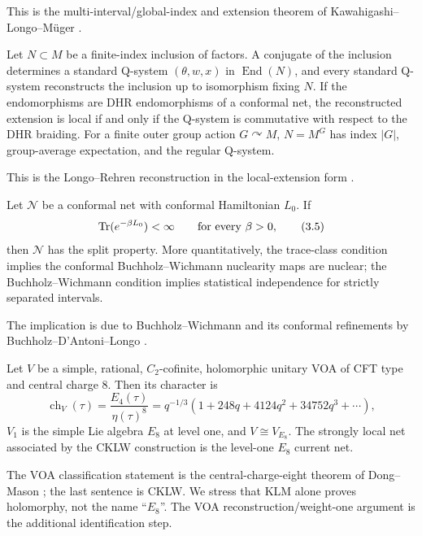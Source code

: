 This is the multi-interval/global-index and extension theorem of
Kawahigashi--Longo--M\"uger \cite{KLM}.

\begin{theorem}
\label{thm:Qsystems}
Let $N\subset M$ be a finite-index inclusion of factors.  A conjugate of
the inclusion determines a standard Q-system $(\theta,w,x)$ in
$\operatorname{End}(N)$, and every standard Q-system reconstructs the
inclusion up to isomorphism fixing $N$.  If the endomorphisms are DHR
endomorphisms of a conformal net, the reconstructed extension is local
if and only if the Q-system is commutative with respect to the DHR
braiding.  For a finite outer group action $G\curvearrowright M$,
$N=M^G$ has index $|G|$, group-average expectation, and the regular
Q-system.
\end{theorem}

This is the Longo--Rehren reconstruction in the local-extension form
\cite{LongoRehren}.

\begin{theorem}\label{thm:split}
Let $\mathcal N$ be a conformal net with conformal Hamiltonian $L_0$.
If
\[
 \operatorname{Tr}(e^{-\beta L_0})<\infty\qquad\text{for every }\beta>0,
\tag{3.5}\label{eq:traceclass}
\]
then $\mathcal N$ has the split property.  More quantitatively, the
trace-class condition implies the conformal Buchholz--Wichmann
nuclearity maps are nuclear; the Buchholz--Wichmann condition implies
statistical independence for strictly separated intervals.
\end{theorem}

The implication is due to Buchholz--Wichmann and its conformal
refinements by Buchholz--D'Antoni--Longo \cite{BuchholzWichmann,BDL}.

\begin{theorem}
\label{thm:DM}
Let $V$ be a simple, rational, $C_2$-cofinite, holomorphic unitary VOA of
CFT type and central charge $8$.  Then its character is
\[
 \operatorname{ch}_V(\tau)
 =\frac{E_4(\tau)}{\eta(\tau)^8}
 =q^{-1/3}(1+248q+4124q^2+34752q^3+\cdots),
\tag{3.6}\label{eq:E8char}
\]
$V_1$ is the simple Lie algebra $E_8$ at level one, and
$V\cong V_{E_8}$.  The strongly local net associated by the CKLW
construction is the level-one $E_8$ current net.
\end{theorem}

The VOA classification statement is the central-charge-eight theorem of
Dong--Mason \cite{DongMason}; the last sentence is CKLW.  We stress that
KLM alone proves holomorphy, not the name ``$E_8$''.  The VOA
reconstruction/weight-one argument is the additional identification step.

